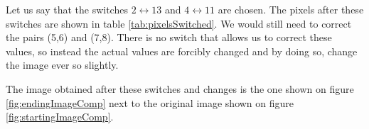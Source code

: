 Let us say that the switches $2\leftrightarrow 13$ and $4\leftrightarrow 11$ are chosen.
The pixels after these switches are shown in table \ref{tab:pixelsSwitched}.
We would still need to correct the pairs (5,6) and (7,8).
There is no switch that allows us to correct these values, so instead the actual values are forcibly changed and by doing so, change the image ever so slightly. 

\begin{table}[h]
\caption{Pixels after switching}
\label{tab:pixelsSwitched}
\centering
{}
\end{table}


The image obtained after these switches and changes is the one shown on figure \ref{fig:endingImageComp} next to the original image shown on figure \ref{fig:startingImageComp}.


